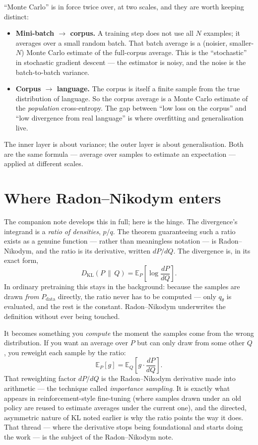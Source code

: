 \documentclass[11pt]{article}
\begin{document}
``Monte Carlo'' is in force twice over, at two scales, and they are worth keeping distinct:
\begin{itemize}[leftmargin=1.4em]
  \item \textbf{Mini-batch $\to$ corpus.} A training step does not use all $N$ examples; it
  averages over a small random batch. That batch average is a (noisier, smaller-$N$) Monte
  Carlo estimate of the full-corpus average. This is the ``stochastic'' in stochastic gradient
  descent --- the estimator is noisy, and the noise is the batch-to-batch variance.
  \item \textbf{Corpus $\to$ language.} The corpus is itself a finite sample from the true
  distribution of language. So the corpus average is a Monte Carlo estimate of the
  \emph{population} cross-entropy. The gap between ``low loss on the corpus'' and ``low
  divergence from real language'' is where overfitting and generalisation live.
\end{itemize}
The inner layer is about variance; the outer layer is about generalisation. Both are the same
formula --- average over samples to estimate an expectation --- applied at different scales.

\section{Where Radon--Nikodym enters}

The companion note develops this in full; here is the hinge. The divergence's integrand is a
\emph{ratio of densities}, $p/q$. The theorem guaranteeing such a ratio exists as a genuine
function --- rather than meaningless notation --- is Radon--Nikodym, and the ratio is its
derivative, written $dP/dQ$. The divergence is, in its exact form,
\[
  D_{\mathrm{KL}}(P\,\|\,Q) = \mathbb{E}_{P}\!\left[\log \frac{dP}{dQ}\right].
\]
In ordinary pretraining this stays in the background: because the samples are drawn
\emph{from} $P_{\text{data}}$ directly, the ratio never has to be computed --- only $q_\theta$
is evaluated, and the rest is the constant. Radon--Nikodym underwrites the definition without
ever being touched.

It becomes something you \emph{compute} the moment the samples come from the wrong
distribution. If you want an average over $P$ but can only draw from some other $Q$, you
reweight each sample by the ratio:
\[
  \mathbb{E}_{P}[g] = \mathbb{E}_{Q}\!\left[g \cdot \frac{dP}{dQ}\right].
\]
That reweighting factor $dP/dQ$ is the Radon--Nikodym derivative made into arithmetic --- the
technique called \emph{importance sampling}. It is exactly what appears in reinforcement-style
fine-tuning (where samples drawn under an old policy are reused to estimate averages under the
current one), and the directed, asymmetric nature of KL noted earlier is why the ratio points
the way it does. That thread --- where the derivative stops being foundational and starts
doing the work --- is the subject of the Radon--Nikodym note.
\end{document}
